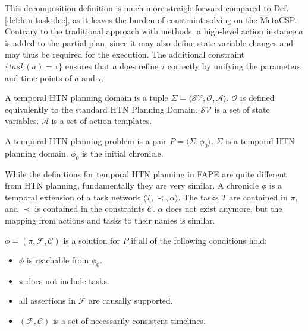 This decomposition definition is much more straightforward compared to Def. \ref{def:htn-task-dec}, as it leaves the burden of constraint solving on the MetaCSP.
Contrary to the traditional approach with methods, a high-level action instance $a$ is added to the partial plan, since it may also define state variable changes and may thus be required for the execution.
The additional constraint $\{task(a) = \tau\}$ ensures that $a$ does refine $\tau$ correctly by unifying the parameters and time points of $a$ and $\tau$.

\begin{definition}
  A temporal \ac{HTN} planning domain is a tuple $\Sigma = \langle \mathcal{SV},\mathcal{O},\mathcal{A} \rangle$.
  $\mathcal{O}$ is defined equivalently to the standard \ac{HTN} Planning Domain.
  $\mathcal{SV}$ is a set of state variables.
  $\mathcal{A}$ is a set of action templates.
\end{definition}

\begin{definition}
  A temporal \ac{HTN} planning problem is a pair $P = \langle \Sigma, \phi_0 \rangle$.
  $\Sigma$ is a temporal \ac{HTN} planning domain.
  $\phi_0$ is the initial chronicle.
\end{definition}

While the definitions for temporal \ac{HTN} planning in \ac{FAPE} are quite different from \ac{HTN} planning, fundamentally they are very similar.
A chronicle $\phi$ is a temporal extension of a task network $\langle T,\prec,\alpha \rangle$.
The tasks $T$ are contained in $\pi$, and $\prec$ is contained in the constraints $\mathcal{C}$.
$\alpha$ does not exist anymore, but the mapping from actions and tasks to their names is similar.


\begin{definition}
  $\phi = (\pi,\mathcal{F},\mathcal{C})$ is a solution for $P$ if all of the following conditions hold:
  \begin{itemize}
    \item $\phi$ is reachable from $\phi_0$.
    \item $\pi$ does not include tasks.
    \item all assertions in $\mathcal{F}$ are causally supported.
    \item $(\mathcal{F},\mathcal{C})$ is a set of necessarily consistent timelines.
  \end{itemize}
\end{definition}

